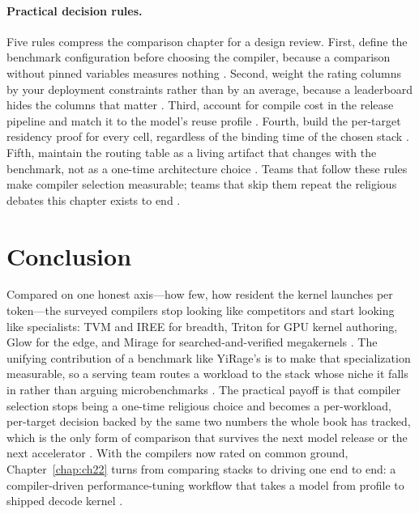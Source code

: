 \paragraph{Practical decision rules.}
Five rules compress the comparison chapter for a design review. First, define the benchmark configuration before choosing the compiler, because a comparison without pinned variables measures nothing \citep{patel2025llminference,memoryfloor2026}. Second, weight the rating columns by your deployment constraints rather than by an average, because a leaderboard hides the columns that matter \citep{taxbreak2026,chen2020compilerbasedhardw}. Third, account for compile cost in the release pipeline and match it to the model's reuse profile \citep{wu2024mirage,kwon2023vllm}. Fourth, build the per-target residency proof for every cell, regardless of the binding time of the chosen stack \citep{amd2024aie,memoryfloor2026}. Fifth, maintain the routing table as a living artifact that changes with the benchmark, not as a one-time architecture choice \citep{yirage2026,patel2025llminference}. Teams that follow these rules make compiler selection measurable; teams that skip them repeat the religious debates this chapter exists to end \citep{memoryfloor2026,taxbreak2026}.

\section{Conclusion}
\label{sec:ch21_conclusion}

Compared on one honest axis---how few, how resident the kernel launches per token---the surveyed compilers stop looking like competitors and start looking like specialists: TVM and IREE for breadth, Triton for GPU kernel authoring, Glow for the edge, and Mirage for searched-and-verified megakernels \citep{chen2018tvm,iree2024,tillet2019triton,rotem2018glow,wu2024mirage}. The unifying contribution of a benchmark like YiRage's is to make that specialization measurable, so a serving team routes a workload to the stack whose niche it falls in rather than arguing microbenchmarks \citep{yirage2026,memoryfloor2026}. The practical payoff is that compiler selection stops being a one-time religious choice and becomes a per-workload, per-target decision backed by the same two numbers the whole book has tracked, which is the only form of comparison that survives the next model release or the next accelerator \citep{taxbreak2026,patel2025llminference}. With the compilers now rated on common ground, Chapter~\ref{chap:ch22} turns from comparing stacks to driving one end to end: a compiler-driven performance-tuning workflow that takes a model from profile to shipped decode kernel \citep{taxbreak2026,patel2025llminference}.

